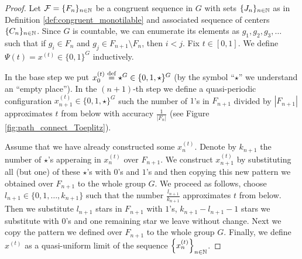 \begin{proof}
Let $\operatorname{\mathcal{F}}=\{F_n\}_{n\in\mathbb{N}}$ be a congruent \Folner sequence in $G$ with sets $\{J_n\}_{n\in\mathbb{N}}$ as in Definition \ref{def:congruent_monotilable} and associated \elegant sequence of centers $\{C_n\}_{n\in\mathbb{N}}$. Since $G$ is countable, we can enumerate its elements as $g_1, g_2, g_3,\ldots$ such that if $g_i\in F_n$ and $g_j \in F_{n+1}\setminus F_n$, then $i<j$.  Fix $t\in[0,1]$. We define $\Psi(t)= x^{(t)}\in\{0,1\}^G$ inductively. 

In the base step we put $x_0^{(t)}\stackrel{\textup{def}}{=} \star^G\in \{0,1,\star\}^G$ (by the symbol ``$\star$'' we understand an ``empty place''). In the $(n+1)$-th step we define a quasi-periodic configuration $x_{n+1}^{(t)}\in\{0,1,\star\}^G$ such the number of $1$'s in $F_{n+1}$ divided by $|F_{n+1}|$ approximates $t$ from below with accuracy $\frac{1}{|F_n|}$ (see Figure \ref{fig:path_connect_Toeplitz}). 

Assume that we have already constructed some $x_{n}^{(t)}$. 
Denote by $k_{n+1}$ the number of $\star$'s apperaing in $x_{n}^{(t)}$ over $F_{n+1}$.
We construct $x_{n+1}^{(t)}$ by substituting all (but one) 
of these $\star$'s with $0$'s and $1$'s and then copying this new pattern we obtained over $F_{n+1}$ to the whole group $G$. We proceed as follows, choose $l_{n+1}\in\{0,1,\ldots,k_{n+1}\}$ such that the number $\frac{l_{n+1}}{k_{n+1}}$ approximates $t$ from below. Then we substitute $l_{n+1}$ stars in $F_{n+1}$ with $1$'s, $k_{n+1}-l_{n+1}-1$ stars we substitute with $0$'s and one remaining star we leave without change.
%
Next we copy the pattern we defined over $F_{n+1}$ to the whole group $G$.
Finally, we  define $x^{(t)}$ as a quasi-uniform limit of the sequence  $\left\{x_n^{(t)}\right\}_{n\in\mathbb{N}}$.


\end{proof}
